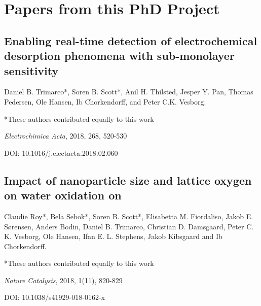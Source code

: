 \chapter{Papers from this PhD Project}
		
		\renewcommand{\thesection}{\Roman{section}}
		\titleformat{\section}{\normalfont\Large\bfseries}{Paper~\thesection}{1em}{}	
		
		\begin{flushleft}
		
		\section{Enabling real-time detection of electrochemical desorption phenomena with sub-monolayer sensitivity}\label{Trimarco2018}
		
		Daniel B. Trimarco*, Soren B. Scott*, Anil H. Thilsted, Jesper Y. Pan, Thomas Pedersen, Ole Hansen, Ib Chorkendorff, and Peter C.K. Vesborg. 
		
		*These authors contributed equally to this work
		
		\textit{Electrochimica Acta}, 2018, 268, 520-530
		
		DOI: 10.1016/j.electacta.2018.02.060
		
		
		
		
		
		
		\clearpage
		\section{Impact of nanoparticle size and lattice oxygen on water oxidation on }\label{Roy2018}
		
		Claudie Roy*, Bela Sebok*, Soren B. Scott*, Elisabetta M. Fiordaliso, Jakob E. Sørensen, Anders Bodin, Daniel B. Trimarco, Christian D. Damsgaard, Peter C. K. Vesborg, Ole Hansen, Ifan E. L. Stephens, Jakob Kibsgaard and Ib Chorkendorff. 
		
		*These authors contributed equally to this work
		
		\textit{Nature Catalysis}, 2018, 1(11), 820-829 
		
		DOI: 10.1038/s41929-018-0162-x
		
			
		
		
		

\end{flushleft}
